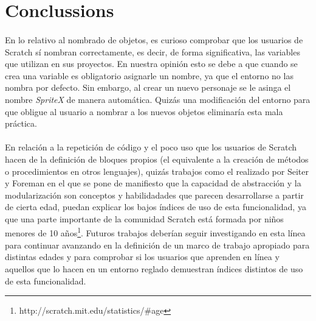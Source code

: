 \documentclass[a4paper,10pt]{article}
\begin{document}
\section{Conclussions}

\paragraph{} En lo relativo al nombrado de objetos, es curioso comprobar que los usuarios de Scratch sí nombran correctamente, es decir, de forma significativa, las variables que utilizan en sus proyectos. En nuestra opinión esto se debe a que cuando se crea una variable es obligatorio asignarle un nombre, ya que el entorno no las nombra por defecto. Sin embargo, al crear un nuevo personaje se le asinga el nombre \textit{SpriteX} de manera automática. Quizás una modificación del entorno para que obligue al usuario a nombrar a los nuevos objetos eliminaría esta mala práctica.
\paragraph{} En relación a la repetición de código y el poco uso que los usuarios de Scratch hacen de la definición de bloques propios (el equivalente a la creación de métodos o procedimientos en otros lenguajes), quizás trabajos como el realizado por Seiter y Foreman \cite{seiter2013modeling} en el que se pone de manifiesto que la capacidad de abstracción y la modularización son conceptos y habilidadades que parecen desarrollarse a partir de cierta edad, puedan explicar los bajos índices de uso de esta funcionalidad, ya que una parte importante de la comunidad Scratch está formada por niños menores de 10 años\footnote{http://scratch.mit.edu/statistics/\#age}. Futuros trabajos deberían seguir investigando en esta línea para continuar avanzando en la definición de un marco de trabajo apropiado para distintas edades y para comprobar si los usuarios que aprenden en línea y aquellos que lo hacen en un entorno reglado demuestran índices distintos de uso de esta funcionalidad. 

\newpage


\end{document}
